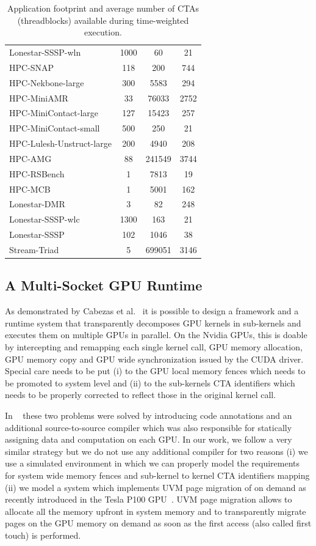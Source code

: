 \begin{table}[t]
\begin{small}
\begin{tabular}{lccc}
Lonestar-SSSP-wln & 1000 & 60 & 21 \\
HPC-SNAP & 118 & 200 & 744 \\
HPC-Nekbone-large & 300 & 5583 & 294 \\
HPC-MiniAMR & 33 & 76033 & 2752 \\
HPC-MiniContact-large & 127 & 15423 & 257 \\
HPC-MiniContact-small & 500 & 250 & 21 \\
HPC-Lulesh-Unstruct-large & 200 & 4940 & 208 \\
HPC-AMG & 88 & 241549 & 3744 \\
HPC-RSBench & 1 & 7813 & 19 \\
HPC-MCB & 1 & 5001 & 162 \\
Lonestar-DMR & 3 & 82 & 248 \\
Lonestar-SSSP-wlc & 1300 & 163 & 21 \\
Lonestar-SSSP & 102 & 1046 & 38 \\
Stream-Triad & 5 & 699051 & 3146 \\
\toprule
\end{tabular}
\caption{Application footprint and average number of CTAs (threadblocks) available during time-weighted execution.}
\label{tab:numctas}
\end{small}
\end{table}

\subsection{A Multi-Socket GPU Runtime}

As demonstrated by Cabezas et al.~\cite{Cabezas2015} it is possible to design 
a framework and a runtime system that transparently decomposes GPU kernels in 
sub-kernels and executes them on multiple GPUs in parallel. On the Nvidia 
GPUs, this is doable by intercepting and remapping each single kernel call, 
GPU memory allocation, GPU memory copy and GPU wide synchronization issued by 
the CUDA driver. Special care needs to be put (i) to the GPU local memory 
fences which needs to be promoted to system level and (ii) to the 
sub-kernels CTA identifiers which needs to be properly corrected to 
reflect those in the original kernel call. 
 
In ~\cite{Cabezas2015} these two problems were solved by introducing  
code annotations and an additional source-to-source compiler which was also 
responsible for statically assigning data and computation on each GPU. In our 
work, we follow a very similar strategy but we do not use any additional 
compiler for two reasons (i) we use a simulated environment in which 
we can properly model the requirements for system wide memory fences 
and sub-kernel to kernel CTA identifiers mapping (ii) we model a system 
which implements UVM page migration of on demand as recently introduced in the 
Tesla P100 GPU~\cite{P100}. UVM page migration allows to allocate 
all the memory upfront in system memory and to transparently migrate pages 
on the GPU memory on demand as soon as the first access (also called first touch) 
is performed.


